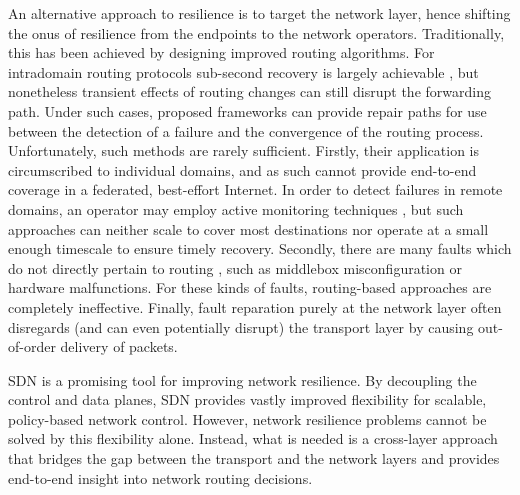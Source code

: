 An alternative approach to resilience is to target the network layer, hence shifting the onus of resilience from the endpoints to the network operators.
Traditionally, this has been achieved by designing improved routing algorithms.
For intradomain routing protocols sub-second recovery is largely achievable \cite{Francois:2005p514}, but nonetheless transient effects of routing changes can still disrupt the forwarding path. 
Under such cases, proposed frameworks \cite{Bryant:2007p522,Torvi:2008p518,Lor:2010:PRE:1868447.1868449} can provide repair paths for use between the detection of a failure and the convergence of the routing process.
Unfortunately, such methods are rarely sufficient.
Firstly, their application is circumscribed to individual domains, and as such cannot provide end-to-end coverage in a federated, best-effort Internet. 
In order to detect failures in remote domains, an operator may employ active monitoring techniques \cite{DBLP:conf/im/FokLMLLCC13}, but such approaches can neither scale to cover most destinations nor operate at a small enough timescale to ensure timely recovery.
Secondly, there are many faults which do not directly pertain to routing \cite{Turner:2010:CFL:2043164.1851220}, such as middlebox misconfiguration or hardware malfunctions.
For these kinds of faults, routing-based approaches are completely ineffective.
Finally, fault reparation purely at the network layer often disregards (and can even potentially disrupt) the transport layer by causing out-of-order delivery of packets.

\ac{SDN} \cite{McKeown:2008:OEI:1355734.1355746} is a promising tool for improving network resilience. By decoupling the control and data planes, \ac{SDN} provides vastly improved flexibility for scalable, policy-based network control. 
However, network resilience problems cannot be solved by this flexibility alone. 
Instead, what is needed is a cross-layer approach that bridges the gap between the transport and the network layers and provides end-to-end insight into network routing decisions.


